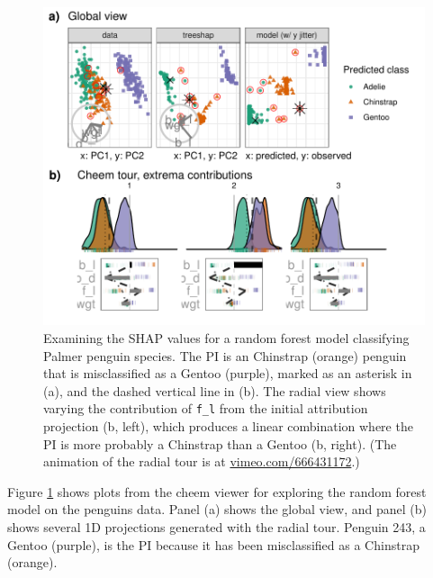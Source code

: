 \documentclass[
]{article}
\begin{document}
\begin{figure}

{\centering \includegraphics[width=1\linewidth]{./figures/case_penguins} 

}

\caption{Examining the SHAP values for a random forest model classifying Palmer penguin species. The PI is an Chinstrap (orange) penguin that is misclassified as a Gentoo (purple), marked as an asterisk in (a), and the dashed vertical line in (b). The radial view shows varying the contribution of \texttt{f\_l} from the initial attribution projection (b, left), which produces a linear combination where the PI is more probably a Chinstrap than a Gentoo (b, right). (The animation of the radial tour is at \href{https://vimeo.com/666431172}{vimeo.com/666431172}.)}\label{fig:casepenguins}
\end{figure}

Figure \ref{fig:casepenguins} shows plots from the cheem viewer for exploring the random forest model on the penguins data. Panel (a) shows the global view, and panel (b) shows several 1D projections generated with the radial tour. Penguin 243, a Gentoo (purple), is the PI because it has been misclassified as a Chinstrap (orange).
\end{document}
